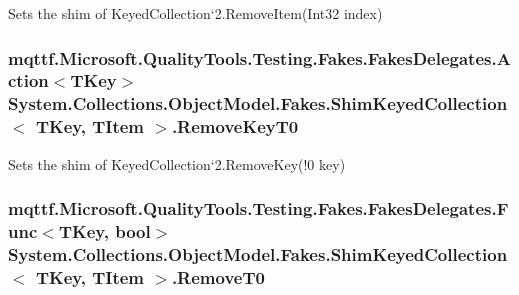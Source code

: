 Sets the shim of Keyed\-Collection`2.Remove\-Item(\-Int32 index)

\hypertarget{class_system_1_1_collections_1_1_object_model_1_1_fakes_1_1_shim_keyed_collection_3_01_t_key_00_01_t_item_01_4_ac1a69ab8c5aec0d4ec381e35c606803e}{
\subsubsection[{Remove\-Key\-T0}]{\setlength{\rightskip}{0pt plus 5cm}mqttf.\-Microsoft.\-Quality\-Tools.\-Testing.\-Fakes.\-Fakes\-Delegates.\-Action$<$T\-Key$>$ System.\-Collections.\-Object\-Model.\-Fakes.\-Shim\-Keyed\-Collection$<$ T\-Key, T\-Item $>$.Remove\-Key\-T0\hspace{0.3cm}{\ttfamily [set]}}}\label{class_system_1_1_collections_1_1_object_model_1_1_fakes_1_1_shim_keyed_collection_3_01_t_key_00_01_t_item_01_4_ac1a69ab8c5aec0d4ec381e35c606803e}


Sets the shim of Keyed\-Collection`2.Remove\-Key(!0 key)

\hypertarget{class_system_1_1_collections_1_1_object_model_1_1_fakes_1_1_shim_keyed_collection_3_01_t_key_00_01_t_item_01_4_ab1f4b19676c14836f2c8358dedbb98b6}{
\subsubsection[{Remove\-T0}]{\setlength{\rightskip}{0pt plus 5cm}mqttf.\-Microsoft.\-Quality\-Tools.\-Testing.\-Fakes.\-Fakes\-Delegates.\-Func$<$T\-Key, bool$>$ System.\-Collections.\-Object\-Model.\-Fakes.\-Shim\-Keyed\-Collection$<$ T\-Key, T\-Item $>$.Remove\-T0\hspace{0.3cm}{\ttfamily [set]}}}\label{class_system_1_1_collections_1_1_object_model_1_1_fakes_1_1_shim_keyed_collection_3_01_t_key_00_01_t_item_01_4_ab1f4b19676c14836f2c8358dedbb98b6}


